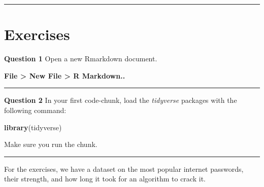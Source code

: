 \documentclass[]{book}
\newenvironment{Shaded}{\begin{snugshade}}{\end{snugshade}}
\newcommand{\DataTypeTok}[1]{\textcolor[rgb]{0.13,0.29,0.53}{#1}}
\newcommand{\DecValTok}[1]{\textcolor[rgb]{0.00,0.00,0.81}{#1}}
\newcommand{\KeywordTok}[1]{\textcolor[rgb]{0.13,0.29,0.53}{\textbf{#1}}}
\newcommand{\NormalTok}[1]{#1}
\newcommand{\OperatorTok}[1]{\textcolor[rgb]{0.81,0.36,0.00}{\textbf{#1}}}
\newcommand{\StringTok}[1]{\textcolor[rgb]{0.31,0.60,0.02}{#1}}
\begin{document}
\begin{center}\rule{0.5\linewidth}{0.5pt}\end{center}

\hypertarget{exercises}{%
\section{Exercises}\label{exercises}}

\textbf{Question 1}
Open a new Rmarkdown document.

\textbf{File \textgreater{} New File \textgreater{} R Markdown..}

\begin{center}\rule{0.5\linewidth}{0.5pt}\end{center}

\textbf{Question 2}
In your first code-chunk, load the \emph{tidyverse} packages with the following command:

\begin{Shaded}
\begin{Highlighting}[]
\KeywordTok{library}\NormalTok{(tidyverse)}
\end{Highlighting}
\end{Shaded}

Make sure you run the chunk.

\begin{center}\rule{0.5\linewidth}{0.5pt}\end{center}

For the exercises, we have a dataset on the most popular internet passwords, their strength, and how long it took for an algorithm to crack it.

\begin{Shaded}
\end{Shaded}
\end{document}
